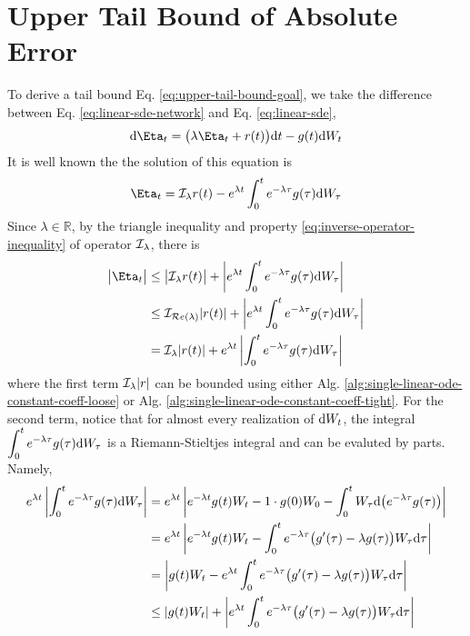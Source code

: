 \section{Upper Tail Bound of Absolute Error}
    To derive a tail bound Eq. \eqref{eq:upper-tail-bound-goal}, we take the difference between Eq. \eqref{eq:linear-sde-network} and Eq. \eqref{eq:linear-sde},
    \begin{equation}
        \d \Eta_t  = \big(\lambda \Eta_t + r(t)\big)\d t - g(t) \d W_t
    \end{equation}
    It is well known the the solution of this equation is
    \begin{equation}
        \Eta_t = \I_{\lambda} r(t) - e^{\lambda t} \int_0^t e^{-\lambda \tau} g(\tau) \d W_\tau
    \end{equation}
    Since $\lambda \in \mathbb{R}$, by the triangle inequality and property \eqref{eq:inverse-operator-inequality} of operator $\mathcal{I}_{\lambda}$, there is
    \begin{align}\label{eq:eta-bound-unevaluated}
        \big|\Eta_t\big| &\leq \big|\I_{\lambda} r(t)\big| + \left|e^{\lambda t} \int_0^t e^{-\lambda \tau} g(\tau) \d W_\tau\right|\\
        &\leq \I_{\Re{\lambda}} |r(t)| + \left|e^{\lambda t} \int_0^t e^{-\lambda \tau} g(\tau) \d W_\tau\right|\\
        &= \I_{\lambda} |r(t)| + e^{\lambda t} \left|\int_0^t e^{-\lambda \tau} g(\tau) \d W_\tau\right|\label{eq:eta-bound-unevaluated}
    \end{align}
    where the first term $\mathcal{I}_{\lambda} |r|$ can be bounded using either Alg. \ref{alg:single-linear-ode-constant-coeff-loose} or Alg. \ref{alg:single-linear-ode-constant-coeff-tight}.
    For the second term, notice that for almost every realization of $\mathrm{d} W_t$, the integral $\displaystyle \int_0^t e^{-\lambda \tau} g(\tau) \mathrm{d} W_\tau$ is a Riemann-Stieltjes integral and can be evaluted by parts.
    Namely, 
    \begin{align}
        e^{\lambda t} \left|\int_0^t e^{-\lambda \tau} g(\tau) \mathrm{d} W_\tau\right| &= e^{\lambda t} \left|  e^{-\lambda t} g(t) W_t - 1 \cdot g(0) W_0 - \int_{0}^{t} W_\tau \mathrm{d} \big(e^{-\lambda\tau}g(\tau)\big)\right| \\
        &= e^{\lambda t} \left|  e^{-\lambda t} g(t) W_t - \int_{0}^{t} e^{-\lambda\tau}\big(g'(\tau) - \lambda g(\tau)\big) W_\tau \mathrm{d} \tau\right| \\
        &= \left|  g(t) W_t - e^{\lambda t} \int_{0}^{t} e^{-\lambda\tau}\big(g'(\tau) - \lambda g(\tau)\big) W_\tau \mathrm{d} \tau\right| \\
        &\leq \left| g(t)W_t \right| + \left|e^{\lambda t} \int_{0}^{t} e^{-\lambda\tau}\big(g'(\tau) - \lambda g(\tau)\big) W_\tau \mathrm{d} \tau\right|
    \end{align}
